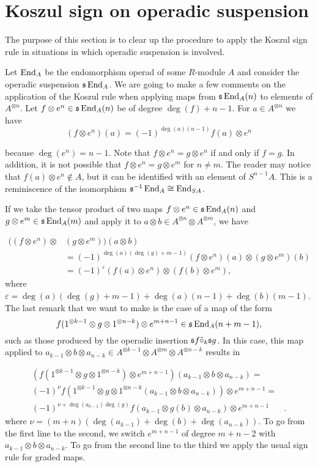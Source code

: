 \documentclass[Thesis.tex]{subfiles}
\begin{document}
\section{Koszul sign on operadic suspension}\label{koszulsigns}
The purpose of this section is to clear up the procedure to apply the Koszul sign rule in situations in which operadic suspension is involved.

Let $\operatorname{End}_A$ be the endomorphism operad of some $R$-module $A$ and consider the operadic suspension $\mathfrak{s}\operatorname{End}_A$. We are going to make a few comments on the application of the Koszul rule when applying maps from $\mathfrak{s}\operatorname{End}_A(n)$ to elements of $A^{\otimes n}$. Let $f\otimes e^n\in\mathfrak{s}\operatorname{End}_A(n)$ be of degree $\deg(f)+n-1$. %
For $a\in A^{\otimes n}$ we have \[(f\otimes e^n)(a)=(-1)^{\deg(a)(n-1)}f(a)\otimes e^n\]

because $\deg(e^n)=n-1$. Note that $f\otimes e^n=g\otimes e^n$ if and only if $f=g$. In addition, it is not possible that $f\otimes e^n=g\otimes e^m$ for $n\neq m$. %
The reader may notice that $f(a)\otimes  e^n\notin A$, but it can be identified with an element of $S^{n-1}A$. This is a reminiscence of the isomorphism $\mathfrak{s}^{-1}\operatorname{End}_A\cong \operatorname{End}_{SA}$. %
 

If we take the tensor product of two maps $f\otimes e^n\in\mathfrak{s}\operatorname{End}_A(n)$ and $g\otimes e^m\in\mathfrak{s}\operatorname{End}_A(m)$ and apply it to $a\otimes b\in A^{\otimes n}\otimes A^{\otimes m}$, we have

\begin{align*}
((f\otimes e^n)\otimes &( g\otimes e^m))(a\otimes b)\\
&=(-1)^{\deg(a)(\deg(g)+m-1)}(f\otimes e^n)(a)\otimes( g\otimes e^m)(b)\\
&=(-1)^{\varepsilon}(f(a)\otimes e^n)\otimes(f(b)\otimes e^m),
\end{align*}
where $\varepsilon = \deg(a)(\deg(g)+m-1)+\deg(a)(n-1)+\deg(b)(m-1)$. 
The last remark that we want to make is the case of a map of the form 
\[f(1^{\otimes k-1}\otimes g\otimes 1^{\otimes n-k})\otimes e^{m+n-1}\in\mathfrak{s}\operatorname{End}_A(n+m-1),\] 
such as those produced by the operadic insertion $\mathfrak{s} f\tilde{\circ}_{k} \mathfrak{s} g$. In this case, this map applied to $a_{k-1}\otimes b\otimes a_{n-k}\in A^{\otimes k-1}\otimes A^{\otimes m}\otimes A
^{\otimes n-k}$ results in 

\begin{align*}
(f(1^{\otimes k-1}\otimes g\otimes 1^{\otimes n-k})\otimes e^{m+n-1})(a_{k-1}\otimes b\otimes a_{n-k})=&\\
(-1)^{\nu}f(1^{\otimes k-1}\otimes g\otimes 1^{\otimes n-k}(a_{k-1}\otimes b\otimes a_{n-k}))\otimes e^{m+n-1}=&\\
(-1)^{\nu+\deg(a_{k-1})\deg(g)}f(a_{k-1}\otimes g(b)\otimes a_{n-k})\otimes e^{m+n-1}&.
\end{align*}
where $\nu=(m+n)(\deg(a_{k-1})+\deg(b)+\deg(a_{n-k}))$.
To go from the first line to the second, we switch $e^{m+n-1}$ of degree $m+n-2$  with $a_{k-1}\otimes b\otimes a_{n-k}$. To go from the second line to the third we apply the usual sign rule for graded maps.
\end{document}
